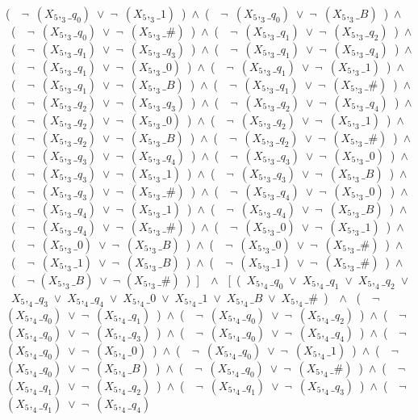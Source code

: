 ﻿\documentclass[a4paper,10pt]{article}
\begin{document}
(\ \ $\neg$\ $(X_5,_3\_q_0)$\ $\vee$\ $\neg$\ $(X_5,_3\_1)$\ )\ $\wedge$\ (\ \ $\neg$\ $(X_5,_3\_q_0)$\ $\vee$\ $\neg$\ $(X_5,_3\_B)$\ )\ $\wedge$\ (\ \ $\neg$\ $(X_5,_3\_q_0)$\ $\vee$\ $\neg$\ $(X_5,_3\_\#)$\ )\ $\wedge$\ (\ \ $\neg$\ $(X_5,_3\_q_1)$\ $\vee$\ $\neg$\ $(X_5,_3\_q_2)$\ )\ $\wedge$\ (\ \ $\neg$\ $(X_5,_3\_q_1)$\ $\vee$\ $\neg$\ $(X_5,_3\_q_3)$\ )\ $\wedge$\ (\ \ $\neg$\ $(X_5,_3\_q_1)$\ $\vee$\ $\neg$\ $(X_5,_3\_q_4)$\ )\ $\wedge$\ (\ \ $\neg$\ $(X_5,_3\_q_1)$\ $\vee$\ $\neg$\ $(X_5,_3\_0)$\ )\ $\wedge$\ (\ \ $\neg$\ $(X_5,_3\_q_1)$\ $\vee$\ $\neg$\ $(X_5,_3\_1)$\ )\ $\wedge$\ (\ \ $\neg$\ $(X_5,_3\_q_1)$\ $\vee$\ $\neg$\ $(X_5,_3\_B)$\ )\ $\wedge$\ (\ \ $\neg$\ $(X_5,_3\_q_1)$\ $\vee$\ $\neg$\ $(X_5,_3\_\#)$\ )\ $\wedge$\ (\ \ $\neg$\ $(X_5,_3\_q_2)$\ $\vee$\ $\neg$\ $(X_5,_3\_q_3)$\ )\ $\wedge$\ (\ \ $\neg$\ $(X_5,_3\_q_2)$\ $\vee$\ $\neg$\ $(X_5,_3\_q_4)$\ )\ $\wedge$\ (\ \ $\neg$\ $(X_5,_3\_q_2)$\ $\vee$\ $\neg$\ $(X_5,_3\_0)$\ )\ $\wedge$\ (\ \ $\neg$\ $(X_5,_3\_q_2)$\ $\vee$\ $\neg$\ $(X_5,_3\_1)$\ )\ $\wedge$\ (\ \ $\neg$\ $(X_5,_3\_q_2)$\ $\vee$\ $\neg$\ $(X_5,_3\_B)$\ )\ $\wedge$\ (\ \ $\neg$\ $(X_5,_3\_q_2)$\ $\vee$\ $\neg$\ $(X_5,_3\_\#)$\ )\ $\wedge$\ (\ \ $\neg$\ $(X_5,_3\_q_3)$\ $\vee$\ $\neg$\ $(X_5,_3\_q_4)$\ )\ $\wedge$\ (\ \ $\neg$\ $(X_5,_3\_q_3)$\ $\vee$\ $\neg$\ $(X_5,_3\_0)$\ )\ $\wedge$\ (\ \ $\neg$\ $(X_5,_3\_q_3)$\ $\vee$\ $\neg$\ $(X_5,_3\_1)$\ )\ $\wedge$\ (\ \ $\neg$\ $(X_5,_3\_q_3)$\ $\vee$\ $\neg$\ $(X_5,_3\_B)$\ )\ $\wedge$\ (\ \ $\neg$\ $(X_5,_3\_q_3)$\ $\vee$\ $\neg$\ $(X_5,_3\_\#)$\ )\ $\wedge$\ (\ \ $\neg$\ $(X_5,_3\_q_4)$\ $\vee$\ $\neg$\ $(X_5,_3\_0)$\ )\ $\wedge$\ (\ \ $\neg$\ $(X_5,_3\_q_4)$\ $\vee$\ $\neg$\ $(X_5,_3\_1)$\ )\ $\wedge$\ (\ \ $\neg$\ $(X_5,_3\_q_4)$\ $\vee$\ $\neg$\ $(X_5,_3\_B)$\ )\ $\wedge$\ (\ \ $\neg$\ $(X_5,_3\_q_4)$\ $\vee$\ $\neg$\ $(X_5,_3\_\#)$\ )\ $\wedge$\ (\ \ $\neg$\ $(X_5,_3\_0)$\ $\vee$\ $\neg$\ $(X_5,_3\_1)$\ )\ $\wedge$\ (\ \ $\neg$\ $(X_5,_3\_0)$\ $\vee$\ $\neg$\ $(X_5,_3\_B)$\ )\ $\wedge$\ (\ \ $\neg$\ $(X_5,_3\_0)$\ $\vee$\ $\neg$\ $(X_5,_3\_\#)$\ )\ $\wedge$\ (\ \ $\neg$\ $(X_5,_3\_1)$\ $\vee$\ $\neg$\ $(X_5,_3\_B)$\ )\ $\wedge$\ (\ \ $\neg$\ $(X_5,_3\_1)$\ $\vee$\ $\neg$\ $(X_5,_3\_\#)$\ )\ $\wedge$\ (\ \ $\neg$ $(X_5,_3\_B)$\ $\vee$\ $\neg$ $(X_5,_3\_\#)$\ )\ ]\ \ $\wedge$ \ [\ (\ $X_5,_4\_q_0$\ $\vee$\ $X_5,_4\_q_1$\ $\vee$\ $X_5,_4\_q_2$\ $\vee$\ $X_5,_4\_q_3$\ $\vee$\ $X_5,_4\_q_4$\ $\vee$\ $X_5,_4\_0$\ $\vee$\ $X_5,_4\_1$\ $\vee$\ $X_5,_4\_B$\ $\vee$\ $X_5,_4\_\#$\ )\ \ $\wedge$ \ (\ \ $\neg$\ $(X_5,_4\_q_0)$\ $\vee$\ $\neg$\ $(X_5,_4\_q_1)$\ )\ $\wedge$\ (\ \ $\neg$\ $(X_5,_4\_q_0)$\ $\vee$\ $\neg$\ $(X_5,_4\_q_2)$\ )\ $\wedge$\ (\ \ $\neg$\ $(X_5,_4\_q_0)$\ $\vee$\ $\neg$\ $(X_5,_4\_q_3)$\ )\ $\wedge$\ (\ \ $\neg$\ $(X_5,_4\_q_0)$\ $\vee$\ $\neg$\ $(X_5,_4\_q_4)$\ )\ $\wedge$\ (\ \ $\neg$\ $(X_5,_4\_q_0)$\ $\vee$\ $\neg$\ $(X_5,_4\_0)$\ )\ $\wedge$\ (\ \ $\neg$\ $(X_5,_4\_q_0)$\ $\vee$\ $\neg$\ $(X_5,_4\_1)$\ )\ $\wedge$\ (\ \ $\neg$\ $(X_5,_4\_q_0)$\ $\vee$\ $\neg$\ $(X_5,_4\_B)$\ )\ $\wedge$\ (\ \ $\neg$\ $(X_5,_4\_q_0)$\ $\vee$\ $\neg$\ $(X_5,_4\_\#)$\ )\ $\wedge$\ (\ \ $\neg$\ $(X_5,_4\_q_1)$\ $\vee$\ $\neg$\ $(X_5,_4\_q_2)$\ )\ $\wedge$\ (\ \ $\neg$\ $(X_5,_4\_q_1)$\ $\vee$\ $\neg$\ $(X_5,_4\_q_3)$\ )\ $\wedge$\ (\ \ $\neg$\ $(X_5,_4\_q_1)$\ $\vee$\ $\neg$\ $(X_5,_4\_q_4)$\ 
\end{document}
